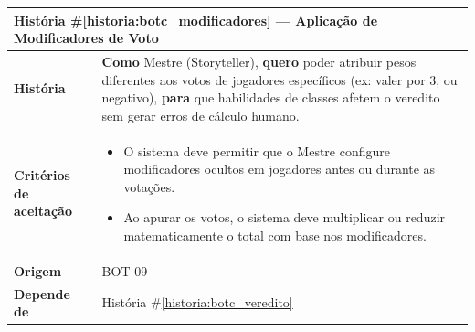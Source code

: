 \documentclass[12pt,a4paper]{article}
\newcounter{historia}
\begin{document}
\label{historia:botc_modificadores}
\begin{table}[H]
    \centering
    \begin{tabular}{|m{4.5cm} | m{11cm}|}
    \hline
    \multicolumn{2}{|l|}{\textbf{História \#\ref{historia:botc_modificadores} --- Aplicação de Modificadores de Voto}} \\
    \hline  \textbf{História} &
    \textbf{Como} Mestre (Storyteller), \newline
    \textbf{quero} poder atribuir pesos diferentes aos votos de jogadores específicos (ex: valer por 3, ou negativo), \newline  
    \textbf{para} que habilidades de classes afetem o veredito sem gerar erros de cálculo humano. \\
    \textbf{Critérios de aceitação} &
    \begin{itemize}
        \item{O sistema deve permitir que o Mestre configure modificadores ocultos em jogadores antes ou durante as votações.}
        \item{Ao apurar os votos, o sistema deve multiplicar ou reduzir matematicamente o total com base nos modificadores.}
    \end{itemize}\\
    \textbf{Origem} & BOT-09 \\
    \textbf{Depende de} & História \#\ref{historia:botc_veredito} \\
    \hline
    \end{tabular}
\end{table}
\end{document}
